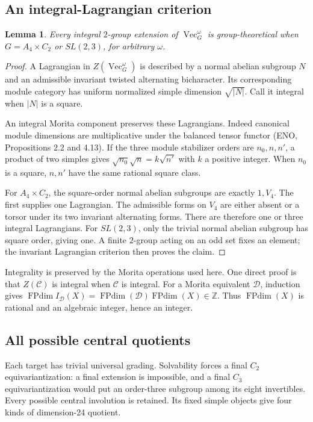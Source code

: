 \documentclass[11pt]{article}
\newtheorem{lemma}[theorem]{Lemma}
\newcommand{\FPdim}{\operatorname{FPdim}}
\renewcommand{\Vec}{\operatorname{Vec}}
\newcommand{\Z}{\mathbb Z}
\begin{document}
\subsection{An integral-Lagrangian criterion}
\begin{lemma}
Every integral $2$-group extension of $\Vec_G^\omega$ is group-theoretical
when $G=A_4\times C_2$ or $SL(2,3)$, for arbitrary $\omega$.
\end{lemma}
\begin{proof}
A Lagrangian in $Z(\Vec_G^\omega)$ is described by a normal abelian
subgroup $N$ and an admissible invariant twisted alternating bicharacter.
Its corresponding module category has uniform normalized simple dimension
$\sqrt{|N|}$. Call it integral when $|N|$ is a square.

An integral Morita component preserves these Lagrangians. Indeed canonical
module dimensions are multiplicative under the balanced tensor functor
(ENO, Propositions 2.2 and 4.13). If the three module stabilizer orders
are $n_0,n,n'$, a product of two simples gives
$\sqrt{n_0}\sqrt n=k\sqrt{n'}$ with $k$ a positive integer.
When $n_0$ is a square, $n,n'$ have the same rational square class.

For $A_4\times C_2$, the square-order normal abelian subgroups are exactly
$1,V_4$. The first supplies one Lagrangian. The admissible forms on $V_4$
are either absent or a torsor under its two invariant alternating forms.
There are therefore one or three integral Lagrangians. For $SL(2,3)$,
only the trivial normal abelian subgroup has square order, giving one.
A finite $2$-group acting on an odd set fixes an element; the invariant
Lagrangian criterion then proves the claim.
\end{proof}
Integrality is preserved by the Morita operations used here. One direct
proof is that $Z(\mathcal C)$ is integral when $\mathcal C$ is integral.
For a Morita equivalent $\mathcal D$, induction gives
$\FPdim I_{\mathcal D}(X)=\FPdim(\mathcal D)\FPdim(X)\in\Z$.
Thus $\FPdim(X)$ is rational and an algebraic integer, hence an integer.

\subsection{All possible central quotients}
Each target has trivial universal grading. Solvability forces a final
$C_2$ equivariantization: a final extension is impossible, and a final
$C_3$ equivariantization would put an order-three subgroup among its eight
invertibles. Every possible central involution is retained. Its fixed
simple objects give four kinds of dimension-24 quotient.
\end{document}
